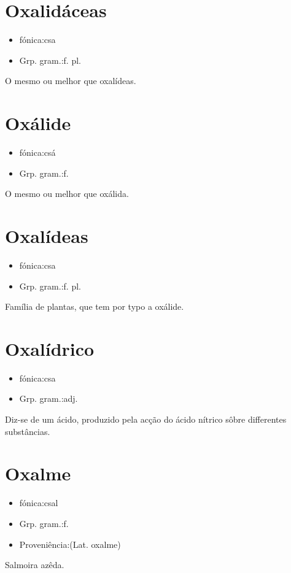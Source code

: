 \section{Oxalidáceas}
\begin{itemize}
\item {fónica:csa}
\end{itemize}
\begin{itemize}
\item {Grp. gram.:f. pl.}
\end{itemize}
O mesmo ou melhor que \textunderscore oxalídeas\textunderscore .
\section{Oxálide}
\begin{itemize}
\item {fónica:csá}
\end{itemize}
\begin{itemize}
\item {Grp. gram.:f.}
\end{itemize}
O mesmo ou melhor que \textunderscore oxálida\textunderscore .
\section{Oxalídeas}
\begin{itemize}
\item {fónica:csa}
\end{itemize}
\begin{itemize}
\item {Grp. gram.:f. pl.}
\end{itemize}
Família de plantas, que tem por typo a oxálide.
\section{Oxalídrico}
\begin{itemize}
\item {fónica:csa}
\end{itemize}
\begin{itemize}
\item {Grp. gram.:adj.}
\end{itemize}
Diz-se de um ácido, produzido pela acção do ácido nítrico sôbre differentes substâncias.
\section{Oxalme}
\begin{itemize}
\item {fónica:csal}
\end{itemize}
\begin{itemize}
\item {Grp. gram.:f.}
\end{itemize}
\begin{itemize}
\item {Proveniência:(Lat. \textunderscore oxalme\textunderscore )}
\end{itemize}
Salmoira azêda.
